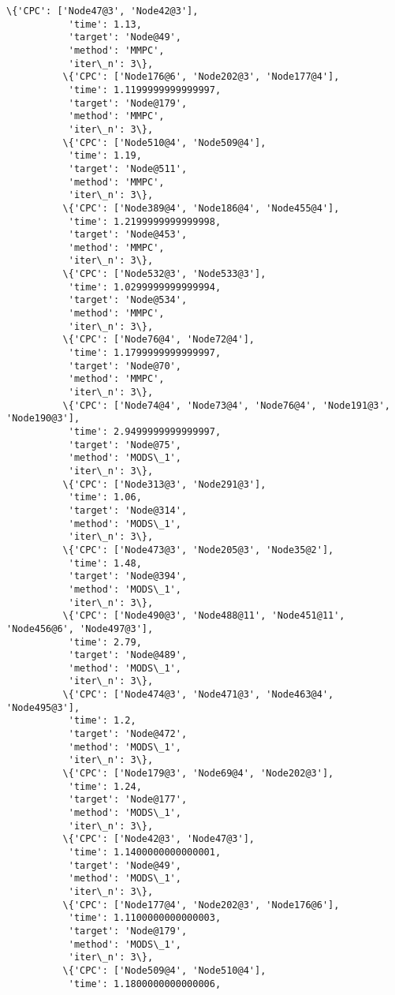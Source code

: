 \documentclass[11pt]{article}
\begin{document}
\begin{Verbatim}[commandchars=\\\{\}]
          \{'CPC': ['Node47@3', 'Node42@3'],
           'time': 1.13,
           'target': 'Node@49',
           'method': 'MMPC',
           'iter\_n': 3\},
          \{'CPC': ['Node176@6', 'Node202@3', 'Node177@4'],
           'time': 1.1199999999999997,
           'target': 'Node@179',
           'method': 'MMPC',
           'iter\_n': 3\},
          \{'CPC': ['Node510@4', 'Node509@4'],
           'time': 1.19,
           'target': 'Node@511',
           'method': 'MMPC',
           'iter\_n': 3\},
          \{'CPC': ['Node389@4', 'Node186@4', 'Node455@4'],
           'time': 1.2199999999999998,
           'target': 'Node@453',
           'method': 'MMPC',
           'iter\_n': 3\},
          \{'CPC': ['Node532@3', 'Node533@3'],
           'time': 1.0299999999999994,
           'target': 'Node@534',
           'method': 'MMPC',
           'iter\_n': 3\},
          \{'CPC': ['Node76@4', 'Node72@4'],
           'time': 1.1799999999999997,
           'target': 'Node@70',
           'method': 'MMPC',
           'iter\_n': 3\},
          \{'CPC': ['Node74@4', 'Node73@4', 'Node76@4', 'Node191@3', 'Node190@3'],
           'time': 2.9499999999999997,
           'target': 'Node@75',
           'method': 'MODS\_1',
           'iter\_n': 3\},
          \{'CPC': ['Node313@3', 'Node291@3'],
           'time': 1.06,
           'target': 'Node@314',
           'method': 'MODS\_1',
           'iter\_n': 3\},
          \{'CPC': ['Node473@3', 'Node205@3', 'Node35@2'],
           'time': 1.48,
           'target': 'Node@394',
           'method': 'MODS\_1',
           'iter\_n': 3\},
          \{'CPC': ['Node490@3', 'Node488@11', 'Node451@11', 'Node456@6', 'Node497@3'],
           'time': 2.79,
           'target': 'Node@489',
           'method': 'MODS\_1',
           'iter\_n': 3\},
          \{'CPC': ['Node474@3', 'Node471@3', 'Node463@4', 'Node495@3'],
           'time': 1.2,
           'target': 'Node@472',
           'method': 'MODS\_1',
           'iter\_n': 3\},
          \{'CPC': ['Node179@3', 'Node69@4', 'Node202@3'],
           'time': 1.24,
           'target': 'Node@177',
           'method': 'MODS\_1',
           'iter\_n': 3\},
          \{'CPC': ['Node42@3', 'Node47@3'],
           'time': 1.1400000000000001,
           'target': 'Node@49',
           'method': 'MODS\_1',
           'iter\_n': 3\},
          \{'CPC': ['Node177@4', 'Node202@3', 'Node176@6'],
           'time': 1.1100000000000003,
           'target': 'Node@179',
           'method': 'MODS\_1',
           'iter\_n': 3\},
          \{'CPC': ['Node509@4', 'Node510@4'],
           'time': 1.1800000000000006,

\end{Verbatim}
\end{document}

